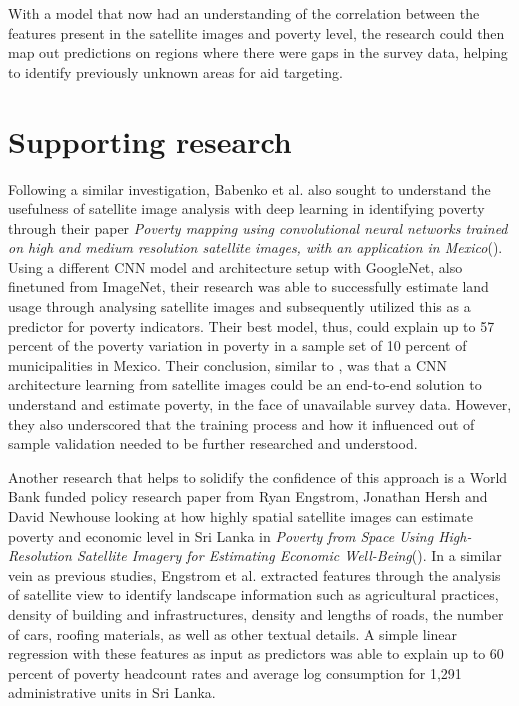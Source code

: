 \documentclass[solid,math,chem,code,plot,gloss]{bmc}
\begin{document}
With a model that now had an understanding of the correlation between the features present in the satellite images and poverty level, the research could then map out predictions on regions where there were gaps in the survey data, helping to identify previously unknown areas for aid targeting. 

\section{Supporting research}

Following a similar investigation, Babenko et al. also sought to understand the usefulness of satellite image analysis with deep learning in identifying poverty through their paper \textit{Poverty mapping using convolutional neural networks trained on high and medium resolution satellite images, with an application in Mexico}(\cite{Babenko_2017}). Using a different CNN model and architecture setup with GoogleNet, also finetuned from ImageNet, their research was able to successfully estimate land usage through analysing satellite images and subsequently utilized this as a predictor for poverty indicators. Their best model, thus, could explain up to 57 percent of the poverty variation in poverty in a sample set of 10 percent of municipalities in Mexico. Their conclusion, similar to \cite{Neal_2016}, was that a CNN architecture learning from satellite images could be an end-to-end solution to understand and estimate poverty, in the face of unavailable survey data. However, they also underscored that the training process and how it influenced out of sample validation needed to be further researched and understood.  

Another research that helps to solidify the confidence of this approach is a World Bank funded policy research paper from Ryan Engstrom, Jonathan Hersh and David Newhouse looking at how highly spatial satellite images can estimate poverty and economic level in Sri Lanka in \textit{Poverty from Space Using High-Resolution Satellite Imagery for Estimating Economic Well-Being}(\cite{WB_2017}). In a similar vein as previous studies, Engstrom et al. extracted features through the analysis of satellite view to identify landscape information such as agricultural practices, density of building and infrastructures, density and lengths of roads, the number of cars, roofing materials, as well as other textual details. A simple linear regression with these features as input as predictors was able to explain up to 60 percent of poverty headcount rates and average log consumption for 1,291 administrative units in Sri Lanka.
\end{document}
